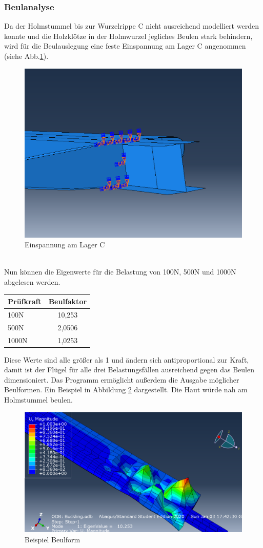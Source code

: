 \subsubsection{Beulanalyse}
Da der Holmstummel bis zur Wurzelrippe C nicht ausreichend modelliert werden konnte und die Holzklötze in der Holmwurzel jegliches Beulen stark behindern, wird für die Beulauslegung eine feste Einspannung am Lager C angenommen (siehe Abb.\ref{BEinspannung}).
\begin{figure}[h]
 \centering
 \includegraphics[scale=0.4]{Bilder/Beuleinspannung}
 \caption{Einspannung am Lager C}
 \label{BEinspannung}
\end{figure}\\
\noindent
Nun können die Eigenwerte für die Belastung von 100N, 500N und 1000N abgelesen werden.
\begin{center}
\begin{tabular}[h]{l|c}
Prüfkraft&Beulfaktor\\
\hline
100N&10,253\\
500N&2,0506\\
1000N&1,0253\\
\end{tabular}
\end{center}
\noindent
Diese Werte sind alle größer als 1 und ändern sich antiproportional zur Kraft, damit ist der Flügel für alle drei Belastungsfällen ausreichend gegen das Beulen dimensioniert.
Das Programm ermöglicht außerdem die Ausgabe möglicher Beulformen. Ein Beispiel in Abbildung \ref{Beulform} dargestellt. Die Haut würde nah am Holmstummel beulen. 
\begin{figure}[h]
 \centering
 \includegraphics[scale=0.4]{Bilder/Beulen100N}
 \caption{Beispiel Beulform}
 \label{Beulform}
\end{figure}
\newpage
\newpage

 

  
